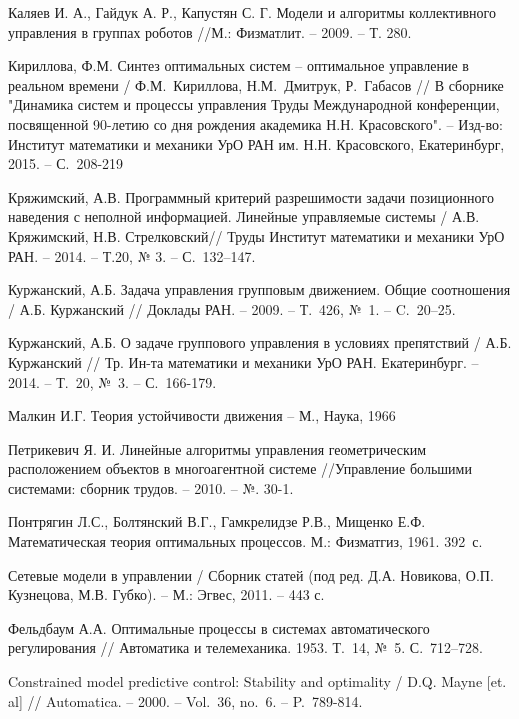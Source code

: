 \begin{biblio}
Каляев И. А., Гайдук А. Р., Капустян С. Г. Модели и алгоритмы коллективного управления в группах роботов //М.: Физматлит. – 2009. – Т. 280.

Кириллова, Ф.М. Синтез оптимальных систем -- оптимальное управление в реальном времени /
Ф.М.~Кириллова, Н.М.~Дмитрук, Р.~Габасов // В сборнике "Динамика систем и процессы управления Труды
Международной конференции, посвященной 90-летию со дня рождения академика Н.Н. Красовского". --
Изд-во: Институт математики и механики УрО РАН им. Н.Н. Красовского, Екатеринбург, 2015. --
С.~208-219

Кряжимский, А.В. Программный критерий разрешимости задачи позиционного наведения с неполной информацией. Линейные управляемые системы / А.В. Кряжимский, Н.В. Стрелковский// Труды Институт математики и механики УрО РАН. -- 2014. -- Т.20, № 3. -- С.~132–147.

Куржанский, А.Б. Задача управления групповым движением. Общие соотношения / А.Б. Куржанский //
Доклады РАН. --  2009. -- Т.~426, №~1. -- C.~20–25.

Куржанский, А.Б. О задаче группового управления в условиях препятствий / А.Б. Куржанский // Тр. Ин-та математики и механики УрО РАН. Екатеринбург. -- 2014. -- Т.~20, №~3. -- С.~166-179.

Малкин И.Г. Теория устойчивости движения -- М., Наука, 1966

Петрикевич Я. И. Линейные алгоритмы управления геометрическим расположением объектов в многоагентной системе //Управление большими системами: сборник трудов. – 2010. – №. 30-1.

Понтрягин Л.С., Болтянский В.Г., Гамкрелидзе Р.В., Мищенко Е.Ф. Математическая теория оптимальных процессов. М.: Физматгиз, 1961. 392~с.

Сетевые модели в управлении / Сборник статей (под
ред. Д.А. Новикова, О.П. Кузнецова, М.В. Губко). – М.: Эгвес,
2011. – 443 с.

Фельдбаум А.А. Оптимальные процессы в системах  автоматического регулирования //
Автоматика и телемеханика. 1953. Т.~14, №~5. С.~712--728.

Constrained model predictive control: Stability and optimality / D.Q. Mayne [et. al]  //
Automatica. -- 2000. -- Vol.~36, no.~6. -- P.~{789-814}.


\end{biblio}
